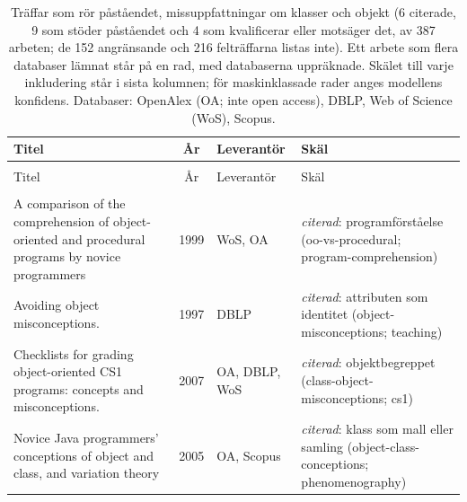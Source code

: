 
\begingroup\footnotesize
\begin{longtable}{@{}%
  >{\raggedright\arraybackslash}p{}c%
  >{\raggedright\arraybackslash}p{}%
  >{\raggedright\arraybackslash}p{}@{}}
\caption{Träffar som rör påståendet, missuppfattningar om klasser och objekt (6 citerade, 9 som stöder påståendet och 4 som kvalificerar eller motsäger det, av 387 arbeten; de 152 angränsande och 216 felträffarna listas inte).  Ett arbete som flera databaser lämnat står på en rad, med databaserna uppräknade. Skälet till varje inkludering står i sista kolumnen; för maskinklassade rader anges modellens konfidens. Databaser: OpenAlex (OA; inte open access), DBLP, Web of Science (WoS), Scopus.}\label{tab:sok-missuppfattningar}\\
\toprule
Titel & År & Leverantör & Skäl \\
\midrule
\endfirsthead
\multicolumn{4}{@{}l}{\emph{\tablename~\thetable{} (\GetTranslation{continued})}}\\
\toprule
Titel & År & Leverantör & Skäl \\
\midrule
\endhead
\midrule \multicolumn{4}{r@{}}{\emph{\GetTranslation{continued on the next page}}}\\
\endfoot
\bottomrule
\endlastfoot
A comparison of the comprehension of object-oriented and procedural programs by novice programmers & 1999 & WoS, OA & \emph{citerad}: programförståelse (oo-vs-procedural; program-comprehension) \\
Avoiding object misconceptions. & 1997 & DBLP & \emph{citerad}: attributen som identitet (object-misconceptions; teaching) \\
Checklists for grading object-oriented CS1 programs: concepts and misconceptions. & 2007 & OA, DBLP, WoS & \emph{citerad}: objektbegreppet (class-object-misconceptions; cs1) \\
Novice Java programmers' conceptions of \textquotedbl{}object\textquotedbl{} and \textquotedbl{}class\textquotedbl{}, and variation theory & 2005 & OA, Scopus & \emph{citerad}: klass som mall eller samling (object-class-conceptions; phenomenography) \\

\end{longtable}
